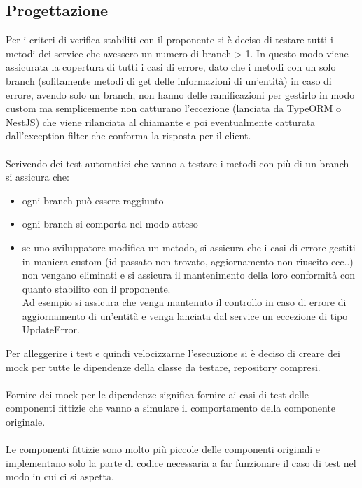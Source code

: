 \subsection{Progettazione}
Per i criteri di verifica stabiliti con il proponente si è deciso di testare tutti i metodi dei service che
avessero un numero di branch > 1. In questo modo viene assicurata la copertura di tutti i casi di errore,
dato che i metodi con un solo branch (solitamente metodi di get delle informazioni di un'entità) in caso 
di errore, avendo solo un branch, non hanno delle ramificazioni per gestirlo in modo custom ma 
semplicemente non catturano l'eccezione (lanciata da TypeORM o NestJS) che viene rilanciata al chiamante 
e poi eventualmente catturata dall'exception filter che conforma la risposta per il client.
\\\\
Scrivendo dei test automatici che vanno a testare i metodi con più di un branch si assicura che:
\begin{itemize}
    \item ogni branch può essere raggiunto
    \item ogni branch si comporta nel modo atteso
    \item se uno sviluppatore modifica un metodo, si assicura che i casi di errore gestiti in maniera custom (id passato non trovato, 
    aggiornamento non riuscito ecc..) non vengano eliminati e si assicura il mantenimento della loro
    conformità con quanto stabilito con il proponente. 
    \\
    Ad esempio si assicura che venga mantenuto il controllo in caso di errore di aggiornamento di un'entità e
    venga lanciata dal service un eccezione di tipo UpdateError.
\end{itemize}
\leavevmode\newline
Per alleggerire i test e quindi velocizzarne l'esecuzione si è deciso di creare dei mock per tutte le dipendenze
della classe da testare, repository compresi.
\\\\
Fornire dei mock per le dipendenze significa fornire ai casi di test delle componenti fittizie che vanno a simulare
il comportamento della componente originale. 
\\\\
Le componenti fittizie sono molto più piccole delle componenti originali e implementano solo la parte di codice 
necessaria a far funzionare il caso di test nel modo in cui ci si aspetta.
\\\\

